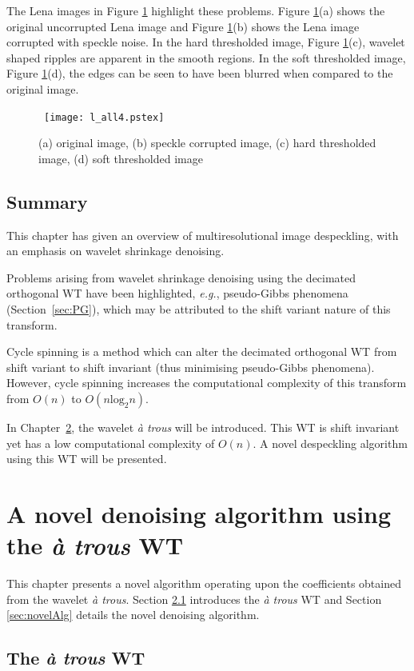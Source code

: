 \documentclass[12pt]{report}
\begin{document}
The Lena images in Figure \ref{badDenoising} highlight these problems.
Figure \ref{badDenoising}(a) shows the original uncorrupted Lena image and
Figure \ref{badDenoising}(b) shows the Lena image corrupted with speckle noise.
In the hard thresholded image, Figure \ref{badDenoising}(c), wavelet shaped ripples are apparent in the smooth
regions. In the soft thresholded image, Figure \ref{badDenoising}(d), 
the edges can be seen to have been blurred when compared to
the original image.

\begin{figure}[htb]
	\centerline{ \hbox {
	\texttt{[image: l\_all4.pstex]}
	}}
	\caption{(a) original image, (b) speckle corrupted image, (c) hard thresholded image, (d) soft thresholded image}
	\label{badDenoising}
\end{figure}

\section{Summary}
This chapter has given an overview of multiresolutional image despeckling, with an emphasis
on wavelet shrinkage denoising. 

Problems arising from wavelet shrinkage denoising using the decimated orthogonal WT have been
highlighted, \emph{e.g.}, pseudo-Gibbs phenomena (Section~\ref{sec:PG}), which may be attributed to the shift 
variant nature of this transform.

Cycle spinning is a method which can alter the decimated orthogonal WT from shift variant to shift invariant 
(thus minimising pseudo-Gibbs phenomena). However, cycle spinning increases the computational complexity of this transform from 
$O(n)$ to $O(n\mbox{log}_{2}n)$.

In Chapter~\ref{ch:novelAlg}, the wavelet \emph{\`a trous} will be introduced.
This WT is shift invariant yet has a low computational complexity of $O(n)$. A novel despeckling
algorithm using this WT will be presented.
\chapter{A novel denoising algorithm using the \emph{\`a trous} WT}
\label{ch:novelAlg}
This chapter presents a novel algorithm operating upon the coefficients
obtained from the wavelet \emph{\`a trous}. Section \ref{sec:WAT} introduces the 
\emph{\`a trous} WT and Section \ref{sec:novelAlg} details the novel denoising algorithm.


\section{The \emph{\`a trous} WT} 
\label{sec:WAT}
\end{document}
